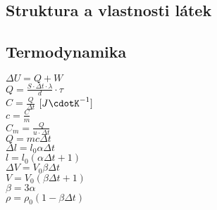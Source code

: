 \documentclass{article}
\begin{document}
\subsection*{Struktura a vlastnosti látek}
\begin{multicols}{3}
\noindent $A_r = \frac{m_a}{u}$\\
$u = 1.66 \cdot 10^{-27} \textrm{ kg}$\\
$M_r = \frac{m_m}{u}$\\
$N_A = 6,022 \cdot 10^{23} \textrm{ mol} ^{-1}$\\
$n = \frac{N}{N_A}$ $[\textrm{mol}]$\\
$M_m = \frac{m}{n}$ $\left[\textrm{kg}\cdot \textrm{mol} ^{-1}}\right]$\\
$M_m = 10^{-3} \cdot M_r$\\
$V_m = \frac{V}{n}$ $\left[\textrm{m}^3\cdot\textrm{mol}^{-1}\right]$\\
$\rho = \frac{M_m}{V_m}$
\end{multicols}

\subsection*{Termodynamika}
\begin{multicols}{4}
\noindent $\Delta U = Q + W$\\
$Q = \frac{S\cdot \Delta t \cdot \lambda}{d}\cdot \tau$\\
$C = \frac{Q}{\Delta t}$ $[J\cdotK^{-1}]$\\
$c = \frac{C}{m}$\\
$C_m = \frac{Q}{u\cdot \Delta t}$\\
$Q = mc\Delta t$\\
$\Delta l = l_0 \alpha \Delta t$\\
$l = l_0(\alpha\Delta t + 1)$\\
$\Delta V = V_0 \beta \Delta t$\\
$V = V_0(\beta\Delta t + 1)$\\
$\beta = 3\alpha$ \\
$\rho = \rho _0 (1 - \beta \Delta t)$
\end{multicols}
\end{document}
